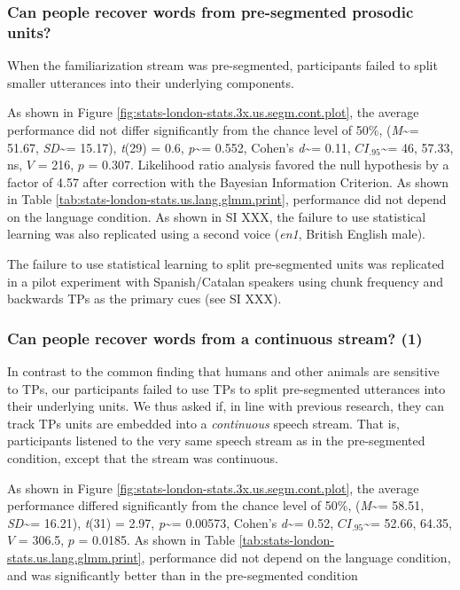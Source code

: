 \documentclass[
]{article}
\newcommand{\T}{{\em t\/}}
\newcommand{\p}{{\em p\/}}
\newcommand{\M}{{\em M\/}}
\newcommand{\SD}{{\em SD\/}}
\newcommand{\D}{Cohen's {\em d\/}}
\newcommand{\CI}{$CI_{.95}$}
\begin{document}
\hypertarget{can-people-recover-words-from-pre-segmented-prosodic-units}{%
\subsubsection{Can people recover words from pre-segmented prosodic
units?}\label{can-people-recover-words-from-pre-segmented-prosodic-units}}

When the familiarization stream was pre-segmented, participants failed
to split smaller utterances into their underlying components.

As shown in Figure \ref{fig:stats-london-stats.3x.us.segm.cont.plot},
the average performance did not differ significantly from the chance
level of 50\%, (\M\textasciitilde= 51.67, \SD\textasciitilde= 15.17),
\T(29) = 0.6, \p\textasciitilde= 0.552, \D\textasciitilde= 0.11,
\CI\textasciitilde= 46, 57.33, ns, \(V\) = 216, \(p\) = 0.307.
Likelihood ratio analysis favored the null hypothesis by a factor of
4.57 after correction with the Bayesian Information Criterion. As shown
in Table \ref{tab:stats-london-stats.us.lang.glmm.print}, performance
did not depend on the language condition. As shown in SI XXX, the
failure to use statistical learning was also replicated using a second
voice (\emph{en1}, British English male).

The failure to use statistical learning to split pre-segmented units was
replicated in a pilot experiment with Spanish/Catalan speakers using
chunk frequency and backwards TPs as the primary cues (see SI XXX).

\hypertarget{can-people-recover-words-from-a-continuous-stream-1}{%
\subsubsection{Can people recover words from a continuous stream?
(1)}\label{can-people-recover-words-from-a-continuous-stream-1}}

In contrast to the common finding that humans and other animals are
sensitive to TPs, our participants failed to use TPs to split
pre-segmented utterances into their underlying units. We thus asked if,
in line with previous research, they can track TPs units are embedded
into a \emph{continuous} speech stream. That is, participants listened
to the very same speech stream as in the pre-segmented condition, except
that the stream was continuous.

As shown in Figure \ref{fig:stats-london-stats.3x.us.segm.cont.plot},
the average performance differed significantly from the chance level of
50\%, (\M\textasciitilde= 58.51, \SD\textasciitilde= 16.21), \T(31) =
2.97, \p\textasciitilde= 0.00573, \D\textasciitilde= 0.52,
\CI\textasciitilde= 52.66, 64.35, \(V\) = 306.5, \(p\) = 0.0185. As
shown in Table \ref{tab:stats-london-stats.us.lang.glmm.print},
performance did not depend on the language condition, and was
significantly better than in the pre-segmented condition
\end{document}
